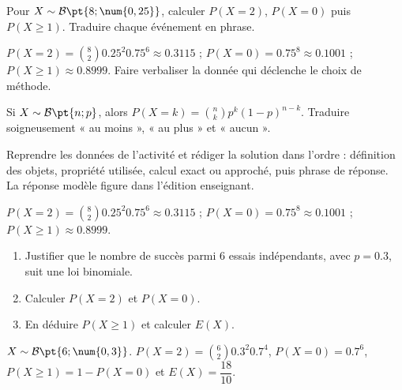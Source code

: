 \begin{activity}
Pour $X\sim\mathcal B\pt{8;\num{0,25}}$, calculer $P(X=2)$, $P(X=0)$ puis $P(X\geq1)$. Traduire chaque événement en phrase.
\begin{center}\end{center}
\end{activity}
\begin{solution}$P(X=2)=\binom82 \num{0,25}^2 \num{0,75}^6\approx\num{0,3115}$ ; $P(X=0)=\num{0,75}^8\approx\num{0,1001}$ ; $P(X\geq1)\approx\num{0,8999}$. Faire verbaliser la donnée qui déclenche le choix de méthode.\end{solution}

\begin{summary}Si $X\sim\mathcal B\pt{n;p}$, alors $P(X=k)=\binom nkp^k(1-p)^{n-k}$. Traduire soigneusement « au moins », « au plus » et « aucun ».\end{summary}

\begin{example}
Reprendre les données de l'activité et rédiger la solution dans l'ordre : définition des objets, propriété utilisée, calcul exact ou approché, puis phrase de réponse. La réponse modèle figure dans l'édition enseignant.
\end{example}
\begin{solution}$P(X=2)=\binom82 \num{0,25}^2 \num{0,75}^6\approx\num{0,3115}$ ; $P(X=0)=\num{0,75}^8\approx\num{0,1001}$ ; $P(X\geq1)\approx\num{0,8999}$.\end{solution}

\begin{exercise}[essentiel]
\begin{enumerate}\item Justifier que le nombre de succès parmi $6$ essais indépendants, avec $p=\num{0,3}$, suit une loi binomiale.\item Calculer $P(X=2)$ et $P(X=0)$.\item En déduire $P(X\geq1)$ et calculer $E(X)$.\end{enumerate}
\end{exercise}
\begin{solution}$X\sim\mathcal B\pt{6;\num{0,3}}$. $P(X=2)=\binom{6}2 \num{0,3}^2 \num{0,7}^{4}$, $P(X=0)=\num{0,7}^{6}$, $P(X\geq1)=1-P(X=0)$ et $E(X)=\dfrac{18}{10}$.\end{solution}

